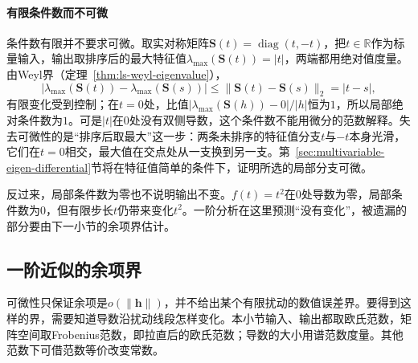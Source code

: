 \paragraph{有限条件数而不可微}
条件数有限并不要求可微。取实对称矩阵$\bm S(t)=\operatorname{diag}(t,-t)$，把$t\in\mathbb R$作为标量输入，输出取排序后的最大特征值$\lambda_{\max}(\bm S(t))=|t|$，两端都用绝对值度量。由Weyl界（定理~\ref{thm:ls-weyl-eigenvalue}），
\[
 |\lambda_{\max}(\bm S(t))-\lambda_{\max}(\bm S(s))|\leq\lVert\bm S(t)-\bm S(s)\rVert_2=|t-s|,
\]
有限变化受到控制；在$t=0$处，比值$|\lambda_{\max}(\bm S(h))-0|/|h|$恒为$1$，所以局部绝对条件数为$1$。可是$|t|$在$0$处没有双侧导数，这个条件数不能用微分的范数解释。失去可微性的是“排序后取最大”这一步：两条未排序的特征值分支$t$与$-t$本身光滑，它们在$t=0$相交，最大值在交点处从一支换到另一支。第~\ref{sec:multivariable-eigen-differential}节将在特征值简单的条件下，证明所选的局部分支可微。

反过来，局部条件数为零也不说明输出不变。$f(t)=t^2$在$0$处导数为零，局部条件数为$0$，但有限步长$t$仍带来变化$t^2$。一阶分析在这里预测“没有变化”，被遗漏的部分要由下一小节的余项界估计。

\subsection{一阶近似的余项界}
\label{sec:multivariable-first-order-remainder}

可微性只保证余项是$o(\lVert\bm h\rVert)$，并不给出某个有限扰动的数值误差界。要得到这样的界，需要知道导数沿扰动线段怎样变化。本小节输入、输出都取欧氏范数，矩阵空间取Frobenius范数，即拉直后的欧氏范数；导数的大小用谱范数度量。其他范数下可借范数等价改变常数。

